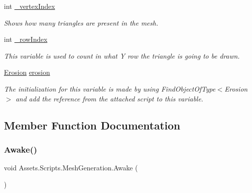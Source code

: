 \begin{DoxyCompactItemize}
\mbox{\label{class_assets_1_1_scripts_1_1_mesh_generation_aa2bd3f3971f61a4aac4a03c65db633e2}} 
int \mbox{\hyperlink{class_assets_1_1_scripts_1_1_mesh_generation_aa2bd3f3971f61a4aac4a03c65db633e2}{\+\_\+vertex\+Index}}
\begin{DoxyCompactList}\small\item\em Shows how many triangles are present in the mesh. \end{DoxyCompactList}\item 
\mbox{\label{class_assets_1_1_scripts_1_1_mesh_generation_a1419d5c719c9d53aa7c4d5e8fa7ac2a2}} 
int \mbox{\hyperlink{class_assets_1_1_scripts_1_1_mesh_generation_a1419d5c719c9d53aa7c4d5e8fa7ac2a2}{\+\_\+row\+Index}}
\begin{DoxyCompactList}\small\item\em This variable is used to count in what Y row the triangle is going to be drawn. \end{DoxyCompactList}\item 
\mbox{\label{class_assets_1_1_scripts_1_1_mesh_generation_a000e9fde649beba061d38980768af3fe}} 
\mbox{\hyperlink{class_assets_1_1_scripts_1_1_erosion}{Erosion}} \mbox{\hyperlink{class_assets_1_1_scripts_1_1_mesh_generation_a000e9fde649beba061d38980768af3fe}{erosion}}
\begin{DoxyCompactList}\small\item\em The initialization for this variable is made by using Find\+Object\+Of\+Type$<$\+Erosion$>$ and add the reference from the attached script to this variable. \end{DoxyCompactList}\end{DoxyCompactItemize}


\subsection{Member Function Documentation}
\mbox{\label{class_assets_1_1_scripts_1_1_mesh_generation_a30849dcee23c658732c99ad36d84dc58}} 
\subsubsection{\texorpdfstring{Awake()}{Awake()}}
{\footnotesize\ttfamily void Assets.\+Scripts.\+Mesh\+Generation.\+Awake (\begin{DoxyParamCaption}{ }\end{DoxyParamCaption})\hspace{0.3cm}{\ttfamily [private]}}



